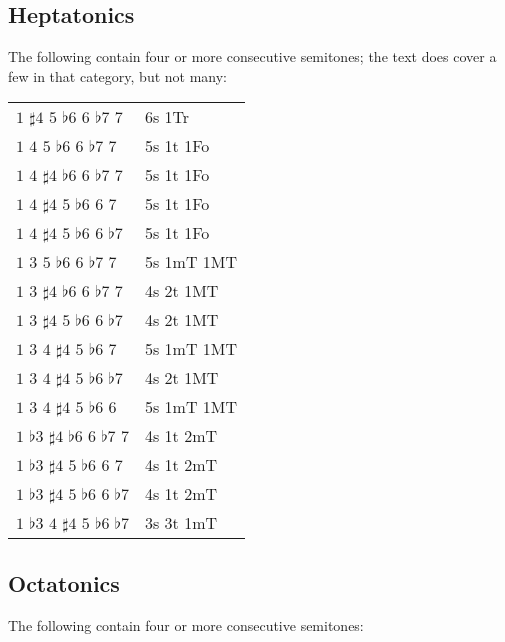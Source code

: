 \documentclass[english]{./gbook}
\begin{document}
\begin{large}
\subsection*{Heptatonics}
The following contain four or more consecutive semitones; the text does cover a few in that category, but not many:

\begin{tabular}{ll}
    $1$ $\sharp4$ $5$ $\flat6$ $6$ $\flat7$ $7$   &   6s 1Tr      \\
    $1$ $4$ $5$ $\flat6$ $6$ $\flat7$ $7$   &   5s 1t 1Fo      \\
    $1$ $4$ $\sharp4$ $\flat6$ $6$ $\flat7$ $7$   &   5s 1t 1Fo      \\
    $1$ $4$ $\sharp4$ $5$ $\flat6$ $6$ $7$   &   5s 1t 1Fo      \\
    $1$ $4$ $\sharp4$ $5$ $\flat6$ $6$ $\flat7$   &   5s 1t 1Fo      \\
    $1$ $3$ $5$ $\flat6$ $6$ $\flat7$ $7$   &   5s 1mT 1MT      \\
    $1$ $3$ $\sharp4$ $\flat6$ $6$ $\flat7$ $7$   &   4s 2t 1MT      \\
    $1$ $3$ $\sharp4$ $5$ $\flat6$ $6$ $\flat7$   &   4s 2t 1MT      \\
    $1$ $3$ $4$ $\sharp4$ $5$ $\flat6$ $7$   &   5s 1mT 1MT      \\
    $1$ $3$ $4$ $\sharp4$ $5$ $\flat6$ $\flat7$   &   4s 2t 1MT      \\
    $1$ $3$ $4$ $\sharp4$ $5$ $\flat6$ $6$   &   5s 1mT 1MT      \\
    $1$ $\flat3$ $\sharp4$ $\flat6$ $6$ $\flat7$ $7$   &   4s 1t 2mT      \\
    $1$ $\flat3$ $\sharp4$ $5$ $\flat6$ $6$ $7$   &   4s 1t 2mT      \\
    $1$ $\flat3$ $\sharp4$ $5$ $\flat6$ $6$ $\flat7$   &   4s 1t 2mT      \\
    $1$ $\flat3$ $4$ $\sharp4$ $5$ $\flat6$ $\flat7$   &   3s 3t 1mT      
\end{tabular}

\subsection*{Octatonics}
The following contain four or more consecutive semitones:


\end{large}
\end{document}
